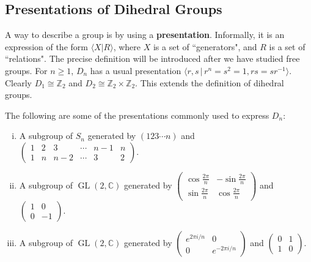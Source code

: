 \subsection{Presentations of Dihedral Groups}
A way to describe a group is by using a \textbf{presentation}. Informally, it is an expression
of the form $\langle X | R\rangle$, where $X$ is a set of ``generators", and $R$ is  a set
of ``relations". The precise definition will be introduced after we have studied free groups. For $n\geq 1$, $D_{n}$ has a usual presentation $\langle r,s\,|\, r^n=s^2=1, rs=sr^{-1}\rangle$. Clearly $D_{1}\cong \mathbb{Z}_2$ and $D_{2}\cong \mathbb{Z}_2\times \mathbb{Z}_2$. This extends the definition of dihedral groups.
\begin{comment}
	\begin{theorem}
		Let $n\geq 3$.
		\begin{enumerate}[(i)]
			\item If $n$ is odd, then $Z(D_n) = \{1\}$.
			\item If $n$ is even, then $Z(D_n) = \{1,r^{n/2}\}$.
		\end{enumerate}
	\end{theorem}
	\begin{sketch}
		For any $i$, $sr^i$ is not in $Z(D_n)$, otherwise $r^2=1$, a contradiction. 
		
		If $r^i\in Z(D_n)$, then $r^is = sr^i$ implies $r^{2i}=1$. This implies $2i = n$ or $2i = 0$.
	\end{sketch}
\end{comment}

The following are some of the presentations commonly used to express $D_n$:
\begin{enumerate}[(i)]
	\item A subgroup of $S_n$ generated by $(123\cdots n)$ and $\begin{pmatrix}
		1 & 2 & 3 & \cdots & n-1 & n\\
	1	 & n & n-2 & \cdots & 3 & 2
	\end{pmatrix}$.
	\item A subgroup of $\operatorname{GL}(2,\mathbb{C})$ generated by $\begin{pmatrix}
		\cos\frac{2\pi}{n} & -\sin\frac{2\pi}{n}
		\\
		\sin\frac{2\pi}{n} & \cos\frac{2\pi}{n}
	\end{pmatrix}$ and $\begin{pmatrix}
	1 & 0 \\
	0 & -1
	\end{pmatrix}$.
	\item A subgroup of $\operatorname{GL}(2,\mathbb{C})$ generated by $\begin{pmatrix}
		e^{2\pi i/n} & 0
		\\
		0 & e^{-2\pi i/n}
	\end{pmatrix}$ and $\begin{pmatrix}
		0 & 1 \\
		1 & 0
	\end{pmatrix}$.
\end{enumerate}

